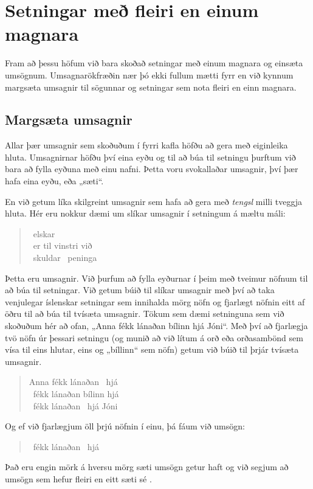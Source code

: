 \chapter{Setningar með fleiri en einum magnara}\label{s:MultipleGenerality}

Fram að þessu höfum við bara skoðað setningar með einum magnara og einsæta umsögnum. Umsagnarökfræðin nær þó ekki fullum mætti fyrr en við kynnum margsæta umsagnir til sögunnar og setningar sem nota fleiri en einn magnara.

\section{Margsæta umsagnir}

Allar þær umsagnir sem skoðuðum í fyrri kafla höfðu að gera með eiginleika hluta. Umsagnirnar höfðu því eina eyðu og til að búa til setningu þurftum við bara að fylla eyðuna með einu nafni. Þetta voru svokallaðar  umsagnir, því þær hafa eina eyðu, eða „sæti“.

En við getum líka skilgreint umsagnir sem hafa að gera með \emph{tengsl} milli tveggja hluta. Hér eru nokkur dæmi um slíkar umsagnir í setningum á mæltu máli:
	\begin{quote}
		\blank\ elskar \blank\\
		\blank\ er til vinstri við \blank\\
		\blank\ skuldar \blank\ peninga
	\end{quote}
Þetta eru  umsagnir. Við þurfum að fylla eyðurnar í þeim með tveimur nöfnum til að búa til setningar. Við getum búið til slíkar umsagnir með því að taka venjulegar íslenskar setningar sem innihalda mörg nöfn og fjarlægt nöfnin eitt af öðru til að búa til tvísæta umsagnir. Tökum sem dæmi setninguna sem við skoðuðum hér að ofan, „Anna fékk lánaðan bílinn hjá Jóni“. Með því að fjarlægja tvö nöfn úr þessari setningu (og munið að við lítum á orð eða orðasambönd sem vísa til eins hlutar, eins og „bíllinn“ sem nöfn) getum við búið til þrjár tvísæta umsagnir.
	\begin{quote}
		Anna fékk lánaðan \blank\ hjá \blank\\
		\blank\ fékk lánaðan bílinn hjá \blank\\
		\blank\ fékk lánaðan \blank\ hjá Jóni
	\end{quote}
Og ef við fjarlægjum öll þrjú nöfnin í einu, þá fáum við  umsögn:
	\begin{quote}
		\blank\ fékk lánaðan \blank\ hjá \blank
	\end{quote}
Það eru engin mörk á hversu mörg sæti umsögn getur haft og við segjum að umsögn sem hefur fleiri en eitt sæti sé .	


